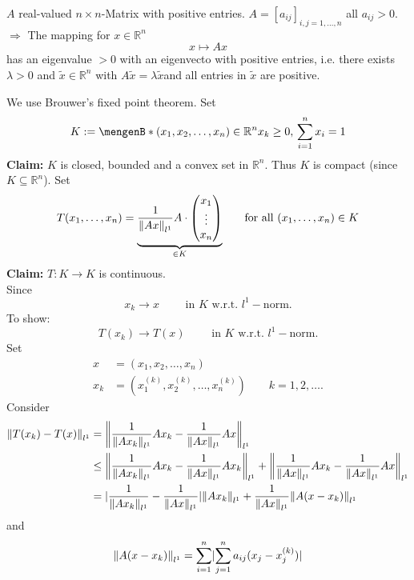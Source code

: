 \begin{theorem}
	$A$ real-valued $n \times n$-Matrix with positive entries. $A = [a_{ij}]_{i,j=1, \dots,n}$ all $a_{ij}>0$. \\
	$\Rightarrow $ The mapping for $x \in \mathbb{R}^n$ 
	\[
		x \mapsto Ax
	\]
	has an eigenvalue $>0$ with an eigenvecto with positive entries, i.e. there exists $\lambda >0$ and $\tilde x \in \mathbb{R}^n$ with $A \tilde x = \lambda \tilde x$and all entries in $\tilde x$ are positive.
\end{theorem}

\begin{beweis}
We use Brouwer's fixed point theorem. Set \[
	K := \set[(x_1,x_2,\dots,x_n) \in \mathbb{R}^n]{x_k \geq 0, \, \sum^{n}_{i=1} x_i = 1}
\]	
\textbf{Claim:} \text{    }     $K$ is closed, bounded and a convex set in $\mathbb{R}^n$. Thus $K$ is compact (since $K \subseteq \mathbb{R}^n$). Set
\[
	T(x_1,\dots,x_n) = \underset{\in K}{\underbrace{\frac{1}{\norm{Ax}_{l^1}}A \cdot \begin{pmatrix}
		x_1 \\ \vdots \\ x_n
	\end{pmatrix}}} \qquad \text{for all }(x_1,\dots,x_n) \in K
\]
\textbf{Claim:} \text{    }     $T: K \to K$ is continuous. \\
Since
\[
	x_k \to x \qquad \text{ in } K \text{ w.r.t. }l^1-\text{norm}.
\]
To show:
\[
	T(x_k) \to T(x) \qquad \text{ in } K \text{ w.r.t. }l^1-\text{norm}.
\]
Set
\begin{align*}
	x &= (x_1,x_2, \dots,x_n) \\
	x_k &= (x_1^{(k)},x_2^{(k)}, \dots, x_n^{(k)}) \qquad k = 1,2,\dots.
\end{align*}
Consider
\begin{align*}
	\norm{T(x_k)-T(x)}_{l^1} &= \norm{ \frac{1}{\norm{Ax_k}_{l^1}} A x_k - \frac{1}{\norm{Ax}_{l^1}} A x }_{l^1} \\
	&\leq  \norm{\frac{1}{\norm{Ax_k}_{l^1}} A x_k - \frac{1}{\norm{Ax}_{l^1}} A x_k}_{l^1} + \norm{\frac{1}{\norm{Ax}_{l^1}} A x_k - \frac{1}{\norm{Ax}_{l^1}} A x}_{l^1} \\
	&= \abs{\frac{1}{\norm{Ax_k}_{l^1}} - \frac{1}{\norm{Ax}_{l^1}}} \norm{A x_k}_{l^1} + \frac{1}{\norm{Ax}_{l^1}} \norm{A(x -x_k)}_{l^1}
\end{align*}
and
\begin{align*}
	\norm{A(x-x_k)}_{l^1} &= \sum^{n}_{i=1} \abs{ \sum^{n}_{j=1} a_{ij}(x_j-x_j^{(k)})} \\

\end{align*}
\end{beweis}
